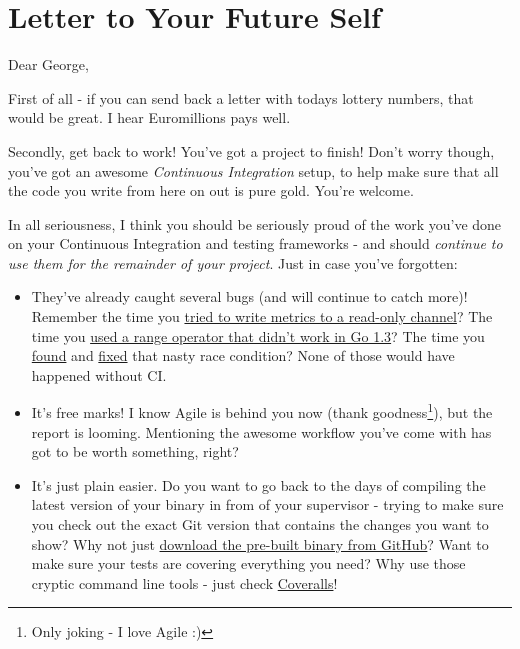 \section{Letter to Your Future Self}
\label{sec:Letter to Your Future Self}

Dear George,


First of all - if you can send back a letter with todays lottery numbers, that
would be great. I hear Euromillions pays well.


Secondly, get back to work! You've got a project to finish! Don't worry though,
you've got an awesome \emph{Continuous Integration} setup, to help make sure that all
the code you write from here on out is pure gold. You're welcome.


In all seriousness, I think you should be seriously proud of the work you've
done on your Continuous Integration and testing frameworks - and should \emph{continue
to use them for the remainder of your project}. Just in case you've forgotten:

\begin{itemize}
  \item They've already caught several bugs (and will continue to catch more)!
  Remember the time you
  \href{https://travis-ci.org/FireEater64/gamq/jobs/93403350#L124}{tried to write
  metrics to a read-only channel}? The time you
  \href{https://travis-ci.org/FireEater64/gamq/builds/92762624}{used a range
  operator that didn't work in Go 1.3}? The time you
  \href{https://travis-ci.org/FireEater64/gamq/jobs/95112027#L143}{found} and
  \href{https://github.com/FireEater64/gamq/commit/5ab48972a8c463859d631f37f75752fd1bfe42d0}{fixed}
  that nasty race condition? None of those would have happened without CI.
  \item It's free marks! I know Agile is behind you now
  (thank goodness\footnote{Only joking - I love Agile :)}), but the report is
  looming. Mentioning the awesome workflow you've come with has got to be worth
  something, right?
  \item It's just plain easier. Do you want to go back to the days of compiling
  the latest version of your binary in from of your supervisor - trying to make
  sure you check out the exact Git version that contains the changes you want to
  show? Why not just
  \href{https://github.com/FireEater64/gamq/releases}{download the pre-built binary from GitHub}?
  Want to make sure your tests are covering everything you need? Why use those
  cryptic command line tools - just check \href{https://coveralls.io/github/FireEater64/gamq?branch=master}{Coveralls}!
\end{itemize}


